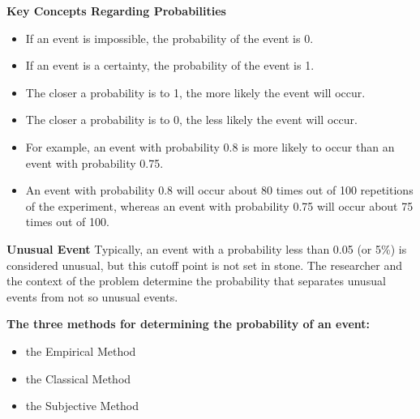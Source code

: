 \documentclass{report}
\begin{document}
    \bigbreak \noindent 
    \textbf{Key Concepts Regarding Probabilities}
    \bigbreak \noindent 
    \begin{itemize}
        \item If an event is impossible, the probability of the event is 0.
        \item If an event is a certainty, the probability of the event is 1.
        \item The closer a probability is to 1, the more likely the event will occur.
        \item The closer a probability is to 0, the less likely the event will occur.
        \item For example, an event with probability 0.8 is more likely to occur than an event with probability 0.75.
        \item An event with probability 0.8 will occur about 80 times out of 100 repetitions of the experiment, whereas an event with probability 0.75 will occur about 75 times out of 100.
    \end{itemize}

    \pagebreak \bigbreak \noindent

    \bigbreak \noindent \bigbreak \noindent 
    \textbf{Unusual Event}
    \bigbreak \noindent 
    Typically, an event with a probability less than 0.05 (or 5\%) is considered unusual, but this cutoff point is not set in stone. The researcher and the context of the problem determine the probability that separates unusual events from not so unusual events.

    \bigbreak \noindent \bigbreak \noindent 
    \textbf{The three methods for determining the probability of an event:}
    \bigbreak \noindent 
    \begin{itemize}
        \item the Empirical Method
        \item the Classical Method
        \item the Subjective Method
    \end{itemize}
\end{document}
